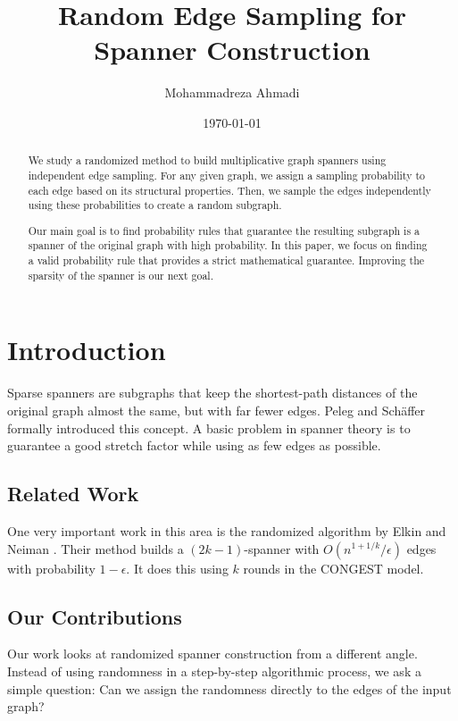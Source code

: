 \documentclass[11pt,a4paper]{article}
\title{\textbf{Random Edge Sampling for Spanner Construction}}
\author{Mohammadreza Ahmadi}
\date{\today}
\begin{document}
\maketitle

\begin{abstract}
We study a randomized method to build multiplicative graph spanners using independent edge sampling. For any given graph, we assign a sampling probability to each edge based on its structural properties. Then, we sample the edges independently using these probabilities to create a random subgraph. 

Our main goal is to find probability rules that guarantee the resulting subgraph is a spanner of the original graph with high probability. In this paper, we focus on finding a valid probability rule that provides a strict mathematical guarantee. Improving the sparsity of the spanner is our next goal.
\end{abstract}

\section{Introduction}
Sparse spanners are subgraphs that keep the shortest-path distances of the original graph almost the same, but with far fewer edges. Peleg and Schäffer \cite{peleg1989graph} formally introduced this concept. A basic problem in spanner theory is to guarantee a good stretch factor while using as few edges as possible.

\subsection{Related Work}
One very important work in this area is the randomized algorithm by Elkin and Neiman \cite{elkin2019efficient}. Their method builds a \((2k-1)\)-spanner with \(O(n^{1+1/k}/\epsilon)\) edges with probability \(1-\epsilon\). It does this using \(k\) rounds in the CONGEST model.

\subsection{Our Contributions}
Our work looks at randomized spanner construction from a different angle. Instead of using randomness in a step-by-step algorithmic process, we ask a simple question: Can we assign the randomness directly to the edges of the input graph?
\end{document}
